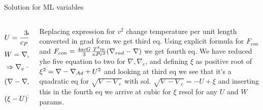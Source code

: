 \begin{wordonframe}{Solution for ML variables}
    \begin{columns}[T]
        \begin{column}{0.5\textwidth}
            \begin{align*}
                &U=\frac{3acT^3}{c_P\rho^2\kappa l_m^2}\sqrt{\frac{8H_P}{g\delta}}\propto\alpha^{-2}H_P^{-\frac{3}{2}}\\
                &W=\nabla_{rad}{}-\nabla_{Ad}{}\\
                &\Rightarrow\nabla_e-\nabla_{Ad}{}=\nabla-\nabla_{Ad}{}-(\nabla-\nabla_e)=2U\sqrt{\nabla-\nabla_e}\\
                &(\nabla-\nabla_e)^{\frac{3}{2}}=\frac{8}{9}U(\nabla_{rad}{}-\nabla)\\
                &(\xi-U)^3+\frac{8U}{9}(\xi^2-U^2-W)=0
            \end{align*}
        \end{column}
        \begin{column}{0.4\textwidth}
            Replacing expression for $v^2$ change temperature per unit length converted in grad form we get third eq. Using explicit formula for $F_{con}$ and $F_{con}=\frac{4acG}{3}\frac{T^4m}{\kappa Pr^2}(\nabla_{rad}{}-\nabla)$ we get fourth eq. We have reduced yhe five equation to two for $\nabla, \nabla_e$, and defining  $\xi$ as positive root of $\xi^2=\nabla-\nabla_{Ad}{}+U^2$ and looking at third eq we see that it's a quadratic eq for $\sqrt{\nabla-\nabla_e}$ with sol. $\sqrt{\nabla-\nabla_e}=-U+\xi$ and inserting this in the fourth eq we arrive at cubic for $\xi$ resol for any $U$ and $W$ params.
        \end{column}
    \end{columns}
    
\end{wordonframe}



